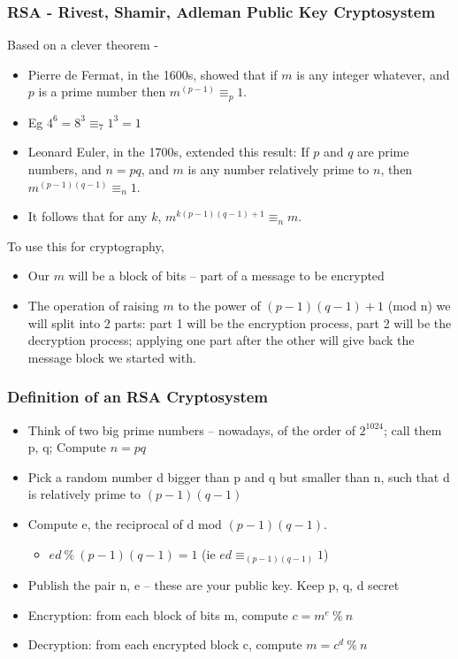 \documentclass[10pt, hyperref={pdfpagelabels=false}]{beamer}
\begin{document}
\begin{frame}
\frametitle{RSA - Rivest, Shamir, Adleman Public Key Cryptosystem}
Based on a clever theorem -
\begin{itemize}
\item Pierre de Fermat, in the 1600s, showed that if $m$ is any integer whatever, and $p$ is a prime number then {\color{blue}$m^{(p-1)} \equiv_p 1$}.
\item Eg $4^6 = 8^3 \equiv_7 1^3 = 1$
\item Leonard Euler, in the 1700s, extended this result: If $p$ and $q$ are prime numbers, and $n = p q$, and $m$ is any number relatively prime to $n$, then $m^{(p-1)(q-1)} \equiv_n 1$.
\item It follows that for any $k$, {\color{blue}$m^{k(p-1)(q-1)+1} \equiv_n m$}.
\end{itemize}

To use this for cryptography,
\begin{itemize}
\item Our $m$ will be a block of bits -- part of a message to be encrypted
\item The operation of raising $m$ to the power of $(p-1)(q-1) + 1$ (mod n)
we will split into 2 parts: part 1 will be the encryption process, part
2 will be the decryption process; applying one part after the other
will give back the message block we started with.
\end{itemize}
\end{frame}

\begin{frame}
\frametitle{Definition of an RSA Cryptosystem}
\begin{itemize}
\item Think of two big prime numbers -- nowadays, of the order of $2^{1024}$; call them p, q; Compute $n = p q$
\item Pick a random number d bigger than p and q but smaller than n, such that d is relatively prime to $(p-1)(q-1)$
\item Compute e, the reciprocal of d mod $(p-1)(q-1)$.
  \begin{itemize}
  \item $e d~\%~(p-1)(q-1) = 1$ (ie $e d \equiv_{(p-1)(q-1)} 1$)
  \end{itemize}
\item Publish the pair n, e -- these are your public key. Keep p, q, d secret
\item Encryption: from each block of bits m, compute $c = m^e~\%~n$
\item Decryption: from each encrypted block c, compute $m = c^d~\%~n$
\end{itemize}
\end{frame}
\end{document}
